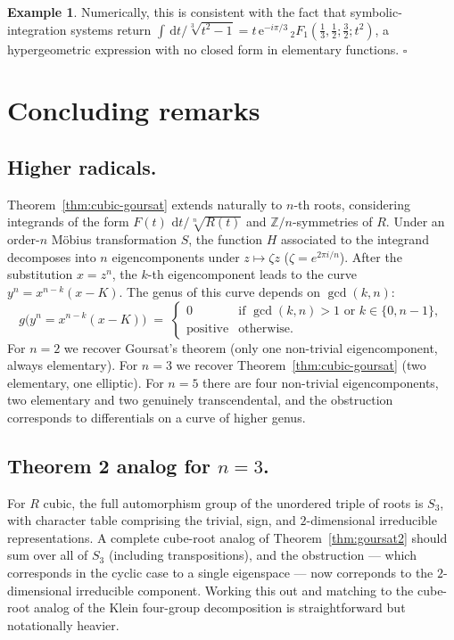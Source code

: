 \documentclass[11pt,a4paper]{article}
\theoremstyle{plain}
\theoremstyle{definition}
\newtheorem{example}[theorem]{Example}
\theoremstyle{remark}
\newcommand{\Z}{\mathbb{Z}}
\renewcommand{\d}{\,\mathrm{d}}
\begin{document}
\begin{example}
Numerically, this is consistent with the fact that symbolic-integration systems return $\int \d t/\sqrt[3]{t^2-1} = t\,\mathrm{e}^{-i\pi/3}\,{}_2F_1(\tfrac{1}{3},\tfrac{1}{2};\tfrac{3}{2}; t^2)$, a hypergeometric expression with no closed form in elementary functions. \hfill$\square$
\end{example}

\section{Concluding remarks}
\label{sec:remarks}

\subsection*{Higher radicals.}
Theorem~\ref{thm:cubic-goursat} extends naturally to $n$-th roots, considering integrands of the form $F(t)\,\d t/\sqrt[n]{R(t)}$ and $\Z/n$-symmetries of $R$. Under an order-$n$ M\"obius transformation $S$, the function $H$ associated to the integrand decomposes into $n$ eigencomponents under $z\mapsto \zeta z$ ($\zeta = e^{2\pi i/n}$). After the substitution $x=z^n$, the $k$-th eigencomponent leads to the curve $y^n = x^{n-k}(x-K)$. The genus of this curve depends on $\gcd(k,n)$:
\[
  g\bigl(y^n = x^{n-k}(x-K)\bigr) \;=\; \begin{cases} 0 & \text{if } \gcd(k,n) > 1 \text{ or } k\in\{0,n-1\}, \\ \text{positive} & \text{otherwise.} \end{cases}
\]
For $n=2$ we recover Goursat's theorem (only one non-trivial eigencomponent, always elementary). For $n=3$ we recover Theorem~\ref{thm:cubic-goursat} (two elementary, one elliptic). For $n=5$ there are four non-trivial eigencomponents, two elementary and two genuinely transcendental, and the obstruction corresponds to differentials on a curve of higher genus.

\subsection*{Theorem 2 analog for $n=3$.}
For $R$ cubic, the full automorphism group of the unordered triple of roots is $S_3$, with character table comprising the trivial, sign, and $2$-dimensional irreducible representations. A complete cube-root analog of Theorem~\ref{thm:goursat2} should sum over all of $S_3$ (including transpositions), and the obstruction --- which corresponds in the cyclic case to a single eigenspace --- now correponds to the $2$-dimensional irreducible component. Working this out and matching to the cube-root analog of the Klein four-group decomposition is straightforward but notationally heavier.
\end{document}
